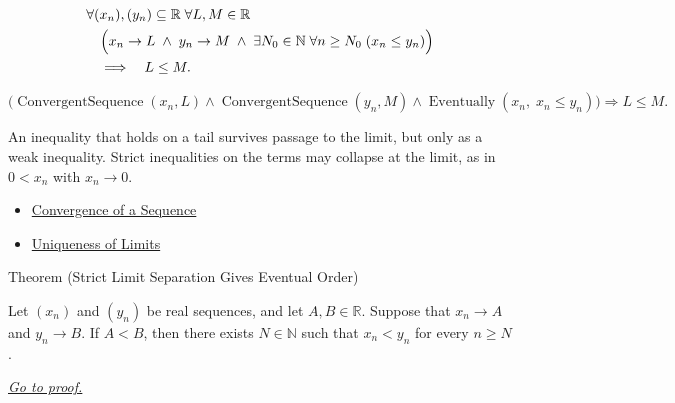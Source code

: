 \begin{remark*}
\[
\begin{aligned}
&\forall (x_n),(y_n)\subseteq\mathbb{R}\;\forall L,M\in\mathbb{R}\\
&\quad\Bigl(
  x_n\to L
  \;\land\;
  y_n\to M
  \;\land\;
  \exists N_0\in\mathbb{N}\;\forall n\ge N_0\;(x_n\le y_n)
\Bigr)\\
&\quad\Longrightarrow\quad L\le M.
\end{aligned}
\]
\end{remark*}

\begin{remark*}
\[
\bigl(
\operatorname{ConvergentSequence}(x_n,L)
\land
\operatorname{ConvergentSequence}(y_n,M)
\land
\operatorname{Eventually}(x_n,\;x_n\le y_n)
\bigr)
\Longrightarrow
L\le M.
\]
\end{remark*}

\begin{remark*}[Interpretation]
An inequality that holds on a tail survives passage to the limit, but only as
a weak inequality. Strict inequalities on the terms may collapse at the
limit, as in $0<x_n$ with $x_n\to 0$.
\end{remark*}

\begin{remark*}[Dependencies]
\begin{itemize}
  \item \hyperref[def:convergent-sequence]{Convergence of a Sequence}
  \item \hyperref[thm:uniqueness-of-limits]{Uniqueness of Limits}
\end{itemize}
\end{remark*}


\begin{theorembox}{Theorem (Strict Limit Separation Gives Eventual Order)}
\begin{theorem}
\label{thm:strict-limit-separation-gives-eventual-order}

Let $(x_n)$ and $(y_n)$ be real sequences, and let $A,B\in\mathbb{R}$.
Suppose that $x_n\to A$ and $y_n\to B$. If $A<B$, then there exists
$N\in\mathbb{N}$ such that $x_n<y_n$ for every $n\ge N$.

\smallskip
\noindent
\hyperref[prf:strict-limit-separation-gives-eventual-order]{\textit{Go to proof.}}
\end{theorem}
\end{theorembox}

